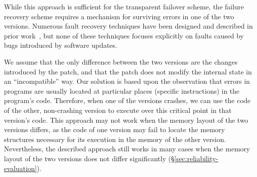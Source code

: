 While this approach is sufficient for the transparent failover scheme, the
failure recovery scheme requires a mechanism for surviving errors in one of the
two versions. Numerous fault recovery techniques have been designed and
described in prior
work~\cite{rx,compl-schedules11,fo,exec-trans06,vigilante,clearview,microreboots,shepherding:pldi14},
but none of these techniques focuses explicitly on faults caused by bugs
introduced by software updates.

We assume that the only difference between the two versions are the
changes introduced by the patch, and that the patch does not modify the
internal state in an ``incompatible'' way. Our solution is based upon the
observation that errors in programs are usually located at particular places
(\ie specific instructions) in the program's code. Therefore, when one of the
versions crashes, we can use the code of the other, non-crashing version to
execute over this critical point in that version's code. This approach may not
work when the memory layout of the two versions differs, as the code of one
version may fail to locate the memory structures necessary for its execution in
the memory of the other version.  Nevertheless, the described approach still
works in many cases when the memory layout of the two versions does not differ
significantly (\S\ref{sec:reliability-evaluation}).

 
